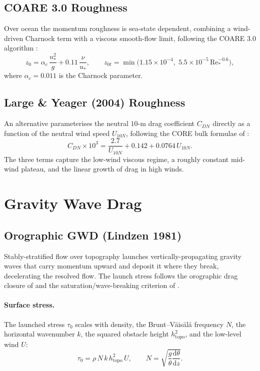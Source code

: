 \documentclass[11pt,twoside]{report}
\newcommand{\dd}{\mathrm{d}}
\begin{document}
\subsection{COARE 3.0 Roughness}

Over ocean the momentum roughness is sea-state dependent, combining a
wind-driven Charnock term with a viscous smooth-flow limit, following the
COARE 3.0 algorithm \citep{Fairall2003}:
\begin{equation}
  z_0 = \alpha_c\,\frac{u_*^2}{g}+0.11\,\frac{\nu}{u_*},
  \qquad
  z_{0t} = \min\!\bigl(1.15\times10^{-4},\;
  5.5\times10^{-5}\,\mathrm{Re}_*^{-0.6}\bigr),
\end{equation}
where $\alpha_c=0.011$ is the Charnock parameter.

\subsection{Large \& Yeager (2004) Roughness}

An alternative parameterises the neutral $10$-m drag coefficient $C_{DN}$
directly as a function of the neutral wind speed $U_{10N}$, following the CORE
bulk formulae of \citet{LargeYeager2004}:
\begin{equation}
  C_{DN}\times10^3 = \frac{2.7}{U_{10N}}+0.142+0.0764\,U_{10N}.
\end{equation}
The three terms capture the low-wind viscous regime, a roughly constant
mid-wind plateau, and the linear growth of drag in high winds.


\section{Gravity Wave Drag}
\label{sec:gwd}

\subsection{Orographic GWD (Lindzen 1981)}

Stably-stratified flow over topography launches vertically-propagating gravity
waves that carry momentum upward and deposit it where they break, decelerating
the resolved flow. The launch stress follows the orographic drag closure of
\citet{McFarlane1987} and the saturation/wave-breaking criterion of
\citet{Lindzen1981}.

\paragraph{Surface stress.}
The launched stress $\tau_0$ scales with density, the Brunt--V\"ais\"al\"a
frequency $N$, the horizontal wavenumber $k$, the squared obstacle height
$h_{\mathrm{topo}}^2$, and the low-level wind $U$:
\begin{equation}
  \tau_0 = \rho\,N\,k\,h_{\mathrm{topo}}^2\,U,
  \qquad N = \sqrt{\frac{g}{\theta}\frac{\dd\theta}{\dd z}}.
\end{equation}
\end{document}
